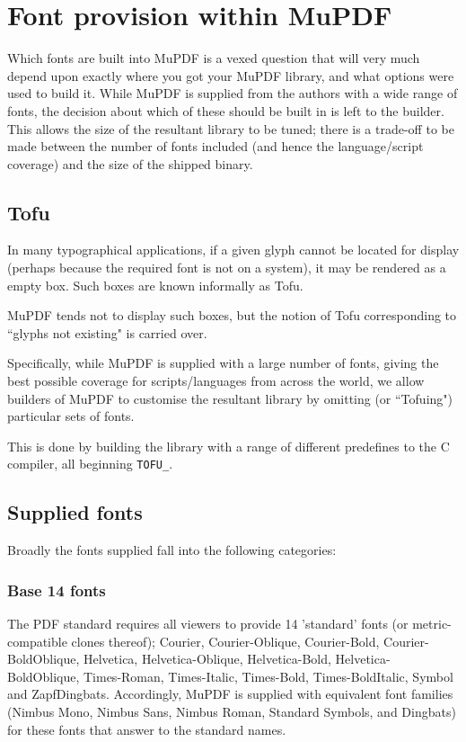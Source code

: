 \documentclass[oneside]{book}
\begin{document}
\chapter{Font provision within MuPDF}
\label{FontProvision}

Which fonts are built into MuPDF is a vexed question that will very much depend upon exactly where you got your MuPDF library, and what options were used to build it. While MuPDF is supplied from the authors with a wide range of fonts, the decision about which of these should be built in is left to the builder. This allows the size of the resultant library to be tuned; there is a trade-off to be made between the number of fonts included (and hence the language/script coverage) and the size of the shipped binary.

\section{Tofu}

In many typographical applications, if a given glyph cannot be located for display (perhaps because the required font is not on a system), it may be rendered as a empty box. Such boxes are known informally as Tofu.

MuPDF tends not to display such boxes, but the notion of Tofu corresponding to ``glyphs not existing" is carried over.

Specifically, while MuPDF is supplied with a large number of fonts, giving the best possible coverage for scripts/languages from across the world, we allow builders of MuPDF to customise the resultant library by omitting (or ``Tofuing") particular sets of fonts.

This is done by building the library with a range of different predefines to the C compiler, all beginning \texttt{TOFU\_}.

\section{Supplied fonts}

Broadly the fonts supplied fall into the following categories:

\subsection{Base 14 fonts}

The PDF standard requires all viewers to provide 14 'standard' fonts (or metric-compatible clones thereof); Courier, Courier-Oblique, Courier-Bold, Courier-BoldOblique, Helvetica, Helvetica-Oblique, Helvetica-Bold, Helvetica-BoldOblique, Times-Roman, Times-Italic, Times-Bold, Times-BoldItalic, Symbol and ZapfDingbats. Accordingly, MuPDF is supplied with equivalent font families (Nimbus Mono, Nimbus Sans, Nimbus Roman, Standard Symbols, and Dingbats) for these fonts that answer to the standard names.
\end{document}
